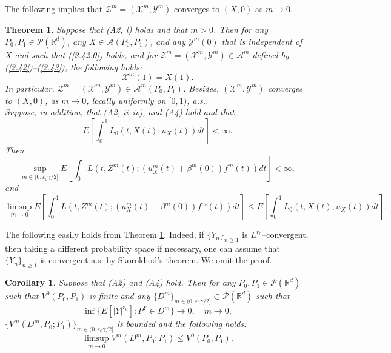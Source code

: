 \documentclass[12pt]{article}
\newtheorem{theorem}{Theorem}[section]
\newtheorem{corollary}{Corollary}[section]
\begin{document}
The following implies that $\mathcal{Z}^m=(\mathcal{X}^m, \mathcal{Y}^m)$ 
converges to $(X, 0)$ as $m\to 0$.

\begin{theorem}\label{thm2.6}
Suppose that (A2, i) holds and that $m>0$.
Then  for any $P_0,P_1\in\mathcal{P}(\mathbb{R}^d)$, any $X\in\mathcal{A}(P_0,P_1)$, and 
any $\mathcal{Y}^m(0)$ that is independent of $X$ and such that (\ref{2.42.0}) holds, and for $\mathcal{Z}^m=(\mathcal{X}^m, \mathcal{Y}^m)\in \mathcal{A}^{m}$ defined by (\ref{2.42})--(\ref{2.43}), the following holds:
\begin{equation}
\mathcal{X}^m(1)=X(1).
\end{equation}
In particular, $\mathcal{Z}^m=(\mathcal{X}^m, \mathcal{Y}^m)\in \mathcal{A}^{m}(P_0,P_1)$.
Besides,
$(\mathcal{X}^m,\mathcal{Y}^m)$ converges to $(X,0)$, as $m\to 0$, locally uniformly on $[0,1)$, a.s..\\
Suppose, in addition, that (A2, ii--iv), and (A4) hold and that
\begin{equation}
E\left[\int_0^1 L_0(t,X(t);u_X(t))dt\right]<\infty.
\end{equation}
Then 
\begin{equation}\label{2.48}
\sup_{m\in (0, \varepsilon_0\gamma/2]}E\left[\int_0^1 L(t,Z^m(t);(u_X^m(t)+\beta^m(0))f^m(t))dt\right]<\infty,
\end{equation}
and 
\begin{equation}\label{2.49}
\limsup_{m\to 0}E\left[\int_0^1 L(t,Z^m(t);(u_X^m(t)+\beta^m(0))f^m(t))dt\right]\le E\left[\int_0^1 L_0(t,X(t);u_X(t))dt\right].
\end{equation}
\end{theorem}

The following easily holds from Theorem \ref{thm2.6}.
Indeed, if $\{Y_n\}_{n\ge 1}$ is $L^{r_0}$--convergent, then taking a different probability space if necessary,
one can assume that $\{Y_n\}_{n\ge 1}$ is convergent a.s. by Skorokhod's theorem.
We omit the proof.

\begin{corollary}\label{co2.4}
Suppose that (A2) and (A4)  hold. Then
for any $P_0,P_1\in \mathcal{P}(\mathbb{R}^d )$ such that $V^0(P_0,P_1)$ is finite
and any $\{D^m \}_{m\in (0, \varepsilon_0\gamma/2]}\subset \mathcal{P}(\mathbb{R}^d)$ such that 
\begin{equation}\label{2.52}
\inf\{E[|Y|^{r_0}]:P^Y\in D^m\}\to 0, \quad m\to 0,
\end{equation}
$\{V^m(D^m,P_0;P_1)\}_{m\in (0, \varepsilon_0\gamma/2]}$ is bounded and the following holds: 
\begin{equation}\label{2.50}
\limsup_{m\to 0}V^m(D^m
,P_0;P_1)\le V^0(P_0,P_1).
\end{equation}
\end{corollary}
\end{document}
